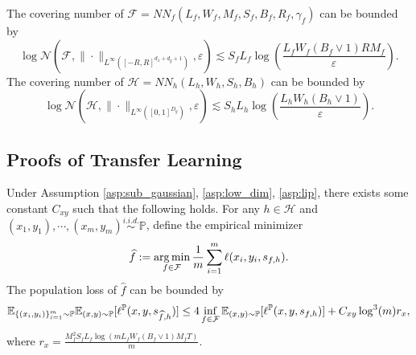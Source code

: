 \documentclass[11pt]{article}
\numberwithin{equation}{section}
\renewcommand{\P}{\mathbb{P}}
\begin{document}
\begin{lemma}\label{lem:covering_num}
    The covering number of $\mathcal{F}=NN_f(L_f,W_f,M_f,S_f,B_f,R_f,\gamma_f)$ can be bounded by
    \begin{equation}
        \log \mathcal{N}(\mathcal{F},\|\cdot\|_{L^\infty([-R,R]^{d_x+d_y+1})},\varepsilon) \lesssim S_fL_f\log\left(\frac{L_fW_f(B_f\vee 1)RM_f}{\varepsilon}\right).
    \end{equation}
    The covering number of $\mathcal{H}=NN_h(L_h,W_h,S_h,B_h)$ can be bounded by
    \begin{equation}
        \log \mathcal{N}(\mathcal{H},\|\cdot\|_{L^\infty([0,1]^{D_y})},\varepsilon) \lesssim S_hL_h\log\left(\frac{L_hW_h(B_h\vee 1)}{\varepsilon}\right).
    \end{equation}
\end{lemma}

\subsection{Proofs of Transfer Learning}\label{app:subsec:generalization_diversity}

\begin{prop}
\label{prop:generalization_test}
    Under Assumption \ref{asp:sub_gaussian}, \ref{asp:low_dim}, \ref{asp:lip}, there exists some constant $C_{xy}$ such that the following holds.
    For any $h\in\mathcal{H}$ and $(x_1,y_1),\cdots,(x_m,y_m)\overset{\textit{i.i.d.}}{\sim}\P$, define the empirical minimizer
    \begin{equation}
        \widehat{f}:= \operatorname*{arg\,min}_{f\in\mathcal{F}} \frac{1}{m}\sum_{i=1}^m \ell(x_i,y_i,s_{f,h}).
    \end{equation}
    The population loss of $\widehat{f}$ can be bounded by
    \begin{equation}
        \E_{\{(x_i,y_i)\}_{i=1}^m\sim \P} \E_{(x,y)\sim\P} [\ell^\P(x,y,s_{\widehat{f},h})]\leq 4\inf_{f\in\mathcal{F}}\E_{(x,y)\sim\P}[\ell^\P(x,y,s_{f,h})] + C_{xy}\log^3(m) r_x,
    \end{equation}
    where $r_x=\frac{M_f^2S_fL_f\log\left(mL_fW_f(B_f\vee 1)M_fT\right)}{m}$.
\end{prop}
\end{document}
